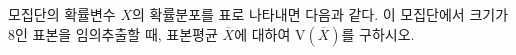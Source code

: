 모집단의 확률변수 $X$의 확률분포를 표로 나타내면 다음과 같다. 이 모집단에서 크기가 8인 표본을 임의추출할 때, 표본평균 $\overline{X}$에 대하여 $\mathrm{V}(\overline{X})$를 구하시오. 
\par\smallskip\begin{center}\resizebox{\ifdim\width>\linewidth\linewidth\else\width\fi}{!}{}\end{center}

